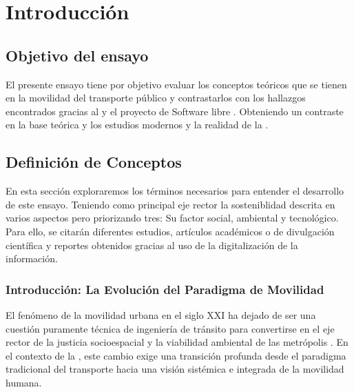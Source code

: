 
\section{Introducción}

\subsection{Objetivo del ensayo}

El presente ensayo tiene por objetivo evaluar los conceptos teóricos que se tienen en la movilidad del transporte público 
y contrastarlos con los hallazgos encontrados gracias al  y 
el proyecto de Software libre . Obteniendo un contraste en la base teórica 
y los estudios modernos y la realidad de la \zmvm.


\subsection{Definición de Conceptos}

En esta sección exploraremos los términos necesarios para entender el desarrollo de este ensayo. Teniendo como principal 
eje rector la sosteniblidad descrita en varios aspectos pero priorizando tres: Su factor social, ambiental y tecnológico. 
Para ello, se citarán diferentes estudios, artículos académicos o de divulgación científica y reportes obtenidos gracias 
al uso de la digitalización de la información.

\subsubsection{Introducción: La Evolución del Paradigma de Movilidad}
\label{subsubsec:evolucion-paradigma}

El fenómeno de la movilidad urbana en el siglo XXI ha dejado de ser una cuestión puramente técnica de ingeniería de 
tránsito para convertirse en el eje rector de la justicia socioespacial y la viabilidad ambiental de las metrópolis 
\cite{Litman2021}. En el contexto de la \zmvm, este cambio exige una transición profunda desde el paradigma tradicional 
del transporte hacia una visión sistémica e integrada de la movilidad humana.

